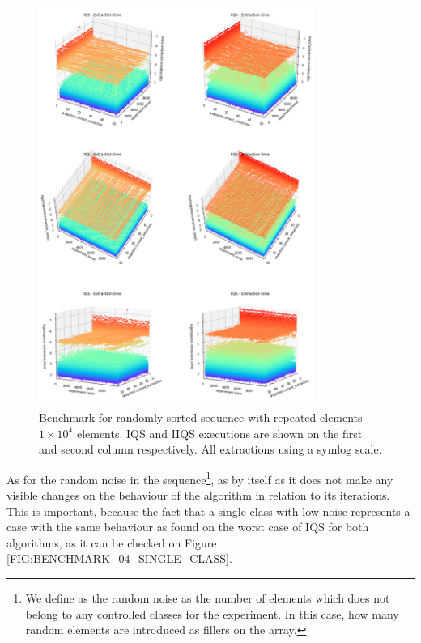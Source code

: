 \begin{figure}[!ht]
    \centering
    \includegraphics[width=0.8\textwidth]{./fragments/04_experimental_execution/images/01_basebenchmark_08_extraction_bias.png}
    \caption{Benchmark for randomly sorted sequence with repeated elements $1\times10^4$ elements. IQS and IIQS executions are shown on the first and second column respectively. All extractions using a symlog scale.}
    \label{FIG:BENCHMARK_08_NOISE_BIAS}
\end{figure}

As for the random noise in the sequence\footnote{We define as the random noise as the number of elements which does not belong to any controlled classes for the experiment. In this case, how many random elements are introduced as fillers on the array.}, as by itself as it does not make any visible changes on the behaviour of the algorithm in relation to its iterations. This is important, because the fact that a single class with low noise represents a case with the same behaviour as found on the worst case of IQS for both algorithms, as it can be checked on Figure \ref{FIG:BENCHMARK_04_SINGLE_CLASS}. 




